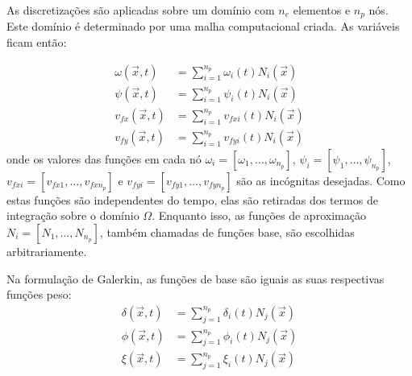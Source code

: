 As discretizações são aplicadas sobre um domínio com $n_e$ elementos e $n_p$ nós.
Este domínio é determinado por uma malha computacional criada.
As variáveis ficam então:

\begin{align}
    \omega(\vec{x}, t) &= \sum_{i=1}^{n_p} \omega_i(t) N_i(\vec{x}) \\
    \psi(\vec{x}, t) &= \sum_{i=1}^{n_p} \psi_i(t) N_i(\vec{x}) \\
    v_{fx}(\vec{x}, t) &= \sum_{i=1}^{n_p} v_{fxi}(t) N_i(\vec{x}) \\
    v_{fy}(\vec{x}, t) &= \sum_{i=1}^{n_p} v_{fyi}(t) N_i(\vec{x}) 
\end{align}
onde os valores das funções em cada nó $\omega_i = [\omega_1, \ldots, \omega_{n_p}]$, $\psi_i = [\psi_1, \ldots, \psi_{n_p}]$, $v_{fxi} = [v_{fx1}, \ldots, v_{fxn_p}]$ e $v_{fyi} = [v_{fy1}, \ldots, v_{fyn_p}]$ são as incógnitas desejadas.
Como estas funções são independentes do tempo, elas são retiradas dos termos de integração sobre o domínio $\Omega$.
Enquanto isso, as funções de aproximação $N_{i} = [N_{1}, \ldots, N_{n_p}]$, também chamadas de funções base, são escolhidas arbitrariamente.

Na formulação de Galerkin, as funções de base são iguais as suas respectivas funções peso:
\begin{align}
    \delta(\vec{x}, t) &= \sum_{j=1}^{n_p} \delta_i(t) N_j(\vec{x}) \\
    \phi(\vec{x}, t) &= \sum_{j=1}^{n_p} \phi_i(t) N_j(\vec{x}) \\
    \xi(\vec{x}, t) &= \sum_{j=1}^{n_p} \xi_i(t) N_j(\vec{x})
\end{align}

